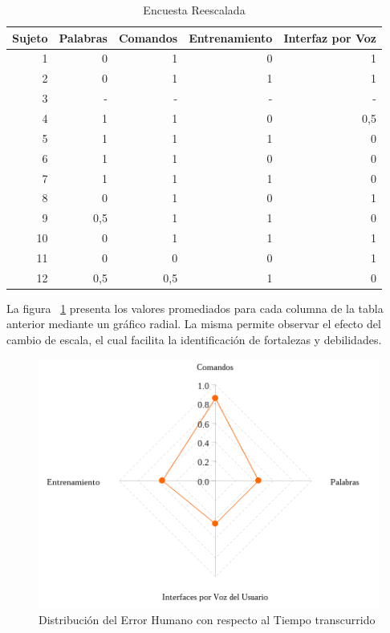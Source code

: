 \begin{table}[H] 
\centering
\footnotesize
\begin{tabular}{|r|r|r|r|r|}
\hline
    Sujeto &  Palabras & Comandos & Entrenamiento & Interfaz por Voz \\
    \hline
1 &  0 & 1 & 0 & 1\\
2 &  0 & 1 & 1 & 1\\
3 &  - & - & - & -\\
4 &  1 & 1 & 0 & 0,5\\
5 &  1 & 1 & 1 & 0\\
6 &  1 & 1 & 0 & 0\\
7 &  1 & 1 & 1 & 0\\
8 &  0 & 1 & 0 & 1\\
9 &  0,5 & 1 & 1 & 0\\
10 & 0 & 1 & 1 & 1\\
11 & 0 & 0 & 0 & 1\\
12 & 0,5 & 0,5 & 1 & 0\\
\hline
\end{tabular}
\caption{Encuesta Reescalada}
\label{sec:tabla-encuesta-normalizada}
\end{table}


La figura ~\ref{figure:kiviat-encuesta2} presenta los valores promediados para cada columna
de la tabla anterior mediante un gr\'afico radial. La misma permite observar el efecto del
cambio de escala, el cual facilita la identificaci\'on de fortalezas y debilidades. 

\begin{figure}[ht]
\centering
\includegraphics[width=0.6\linewidth]{./graphics/kiviat.png}
\caption{Distribuci\'on del Error Humano con respecto al Tiempo transcurrido}
\label{figure:kiviat-encuesta2}
\end{figure}
